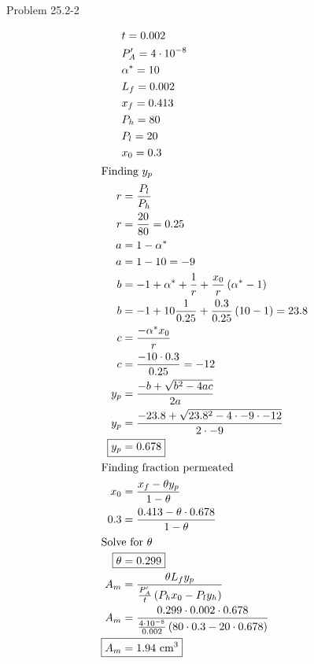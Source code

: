 \item Problem 25.2-2

\begin{align*}
    & t = 0.002 \\
    & P_A' = 4 \cdot 10^{-8} \\
    & \alpha^* = 10 \\
    & L_f = 0.002 \\
    & x_f = 0.413 \\
    & P_h = 80 \\
    & P_l = 20 \\
    & x_0 = 0.3 \\
    \intertext{Finding $y_p$}
    r &= \frac{P_l}{P_h} \\
    r &= \frac{20}{80} = 0.25 \\
    a &= 1 - \alpha^* \\
    a &= 1 - 10 = -9 \\
    b &= -1 + \alpha^* + \frac{1}{r} + \frac{x_0}{r} \left(\alpha^* - 1\right) \\
    b &= -1 + 10 \frac{1}{0.25} + \frac{0.3}{0.25} \left(10 - 1\right) = 23.8 \\
    c &= \frac{-\alpha^*x_0}{r} \\
    c &= \frac{-10 \cdot 0.3}{0.25} = -12 \\
    y_p &= \frac{-b + \sqrt{b^2 - 4ac}}{2a} \\
    y_p &= \frac{-23.8 + \sqrt{23.8^2 - 4 \cdot -9 \cdot -12}}{2 \cdot -9} \\
    \Aboxed{y_p &= 0.678} \\
    \intertext{Finding fraction permeated}
    x_0 &= \frac{x_f - \theta y_p}{1 - \theta} \\
    0.3 &= \frac{0.413 - \theta \cdot 0.678}{1 - \theta} \\
    \intertext{Solve for $\theta$}
    \Aboxed{\theta &= 0.299} \\
    A_m &= \frac{\theta L_f y_p}{\frac{P_A'}{t}\left(P_h x_0 - P_l y_h\right)} \\
    A_m &= \frac{0.299 \cdot 0.002 \cdot 0.678}{\frac{4 \cdot 10^{-8}}{0.002}\left(80 \cdot 0.3 - 20 \cdot 0.678\right)} \\
    \Aboxed{A_m &= 1.94 \text{ cm$^3$}}
\end{align*}